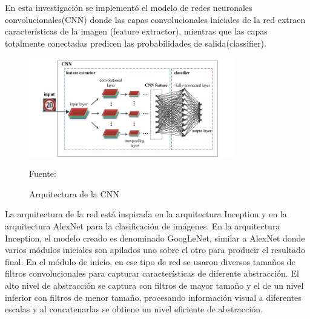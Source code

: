	En esta investigación se implementó el modelo de redes neuronales convolucionales(CNN) donde las capas convolucionales iniciales de la red extraen características de la imagen (feature extractor), mientras que las capas totalmente conectadas predicen las probabilidades de salida(classifier).

	\begin{figure}[H]
		\begin{center}
		\includegraphics[width=0.8\textwidth]{images/desarrollo/networkArquitec/tempGeneralCNNmodel}
		\end{center}
		\begin{center}
		\caption{\small{Arquitectura de la CNN}}
		{\small{Fuente: \cite{ExtremeLearning}}}
		\end{center}
		\vspace{-1.5em}
	\end{figure}
	
	La arquitectura de la red está inspirada en la arquitectura Inception \citep{Inception} y en la arquitectura AlexNet \citep{Krizhevsky2012} para la clasificación de imágenes. En la arquitectura Inception, el modelo creado es denominado GoogLeNet, similar a AlexNet donde varios módulos iniciales son apilados uno sobre el otro para producir el resultado final. En el módulo de inicio, en ese tipo de red se usaron diversos tamaños de filtros convolucionales para capturar características de diferente abstracción. El alto nivel de abstracción se captura con filtros de mayor tamaño y el de un nivel inferior con filtros de menor tamaño, procesando información visual a diferentes escalas y al concatenarlas se obtiene un nivel eficiente de abstracción. 

